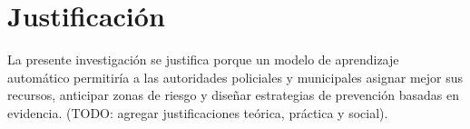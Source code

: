 
\section{Justificación}

\label{sec:justificacion}

La presente investigación se justifica porque un modelo de aprendizaje
automático permitiría a las autoridades policiales y municipales asignar
mejor sus recursos, anticipar zonas de riesgo y diseñar estrategias
de prevención basadas en evidencia. (TODO: agregar justificaciones
teórica, práctica y social).
